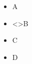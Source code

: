 \documentclass{beamer}
\newcounter{foo}
\begin{document}
\begin{frame}
  \begin{itemize}[<+->]
    \item A
    \item 
        \setcounter{foo}{\insertframeendpage}
        \addtocounter{foo}{-\insertframestartpage}
        \addtocounter{foo}{1}
        \alert<\thefoo>{B}   
    \item C
    \item D 
  \end{itemize}
    \only<+>{}
\end{frame}
\end{document}

